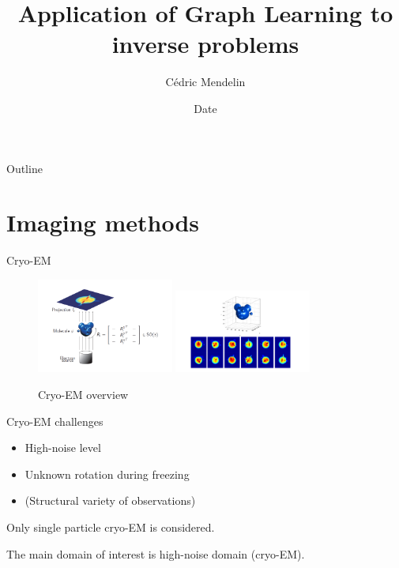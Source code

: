 \documentclass[aspectratio=169]{beamer}
\title              {Application of Graph Learning to inverse problems}
\author     		{Cédric Mendelin}
\institute          {Department of Mathematics and Computer Science, University of Basel}
\date               {Date}
\begin{document}
\begin{frame}[t,plain]
    \titlepage
\end{frame}

\begin{frame}[t]{Outline}
    \tableofcontents
\end{frame}


\section{Imaging methods}	%

\begin{frame}[c]{Cryo-EM}
    \begin{figure}
        \includegraphics[width=0.4\textwidth]{cryo-EM-overview.png}
        \includegraphics[width=0.4\textwidth]{micky-mouse.png}
        \caption{Cryo-EM overview \cite[Figure 1 and Figure 2]{cryoEmMath2}}
    \end{figure}

\end{frame}

\begin{frame}[c]{Cryo-EM challenges}
    \begin{itemize}
        \item High-noise level 
        \item Unknown rotation during freezing
        \item (Structural variety of observations)
    \end{itemize}

    \pause
    \begin{tcolorbox}[colback=red!5!white,colframe=red!75!black]
        Only single particle cryo-EM is considered.
    \end{tcolorbox}

    \pause
    \begin{tcolorbox}[colback=red!5!white,colframe=red!75!black]
        The main domain of interest is high-noise domain (cryo-EM).
    \end{tcolorbox}

\end{frame}
\end{document}
